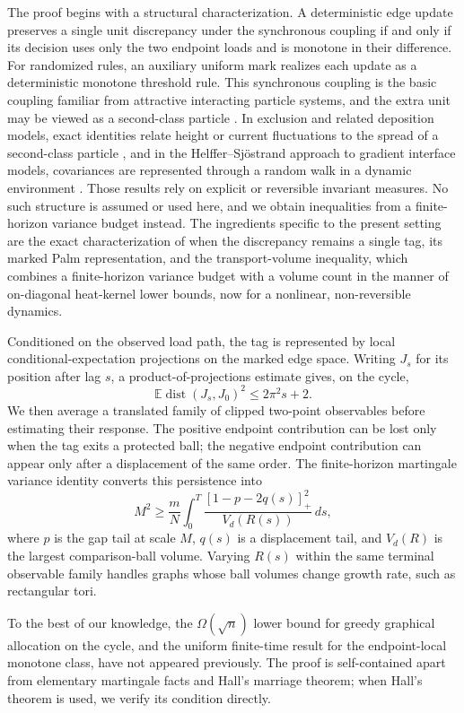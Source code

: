 \documentclass[11pt]{article}
\theoremstyle{remark}
\newcommand{\E}{\mathbb{E}}
\newcommand{\dist}{\operatorname{dist}}
\begin{document}
The proof begins with a structural characterization. A deterministic edge update preserves a single unit discrepancy under the synchronous coupling if and only if its decision uses only the two endpoint loads and is monotone in their difference. For randomized rules, an auxiliary uniform mark realizes each update as a deterministic monotone threshold rule. This synchronous coupling is the basic coupling familiar from attractive interacting particle systems, and the extra unit may be viewed as a second-class particle \cite{Liggett1985}. In exclusion and related deposition models, exact identities relate height or current fluctuations to the spread of a second-class particle \cite{FerrariFontes1994,BalazsSeppalainen2007,BalazsSeppalainen2010}, and in the Helffer--Sj\"ostrand approach to gradient interface models, covariances are represented through a random walk in a dynamic environment \cite{HelfferSjostrand1994,NaddafSpencer1997,GiacominOllaSpohn2001}. Those results rely on explicit or reversible invariant measures. No such structure is assumed or used here, and we obtain inequalities from a finite-horizon variance budget instead. The ingredients specific to the present setting are the exact characterization of when the discrepancy remains a single tag, its marked Palm representation, and the transport-volume inequality, which combines a finite-horizon variance budget with a volume count in the manner of on-diagonal heat-kernel lower bounds, now for a nonlinear, non-reversible dynamics.

Conditioned on the observed load path, the tag is represented by local conditional-expectation projections on the marked edge space. Writing $J_s$ for its position after lag $s$, a product-of-projections estimate gives, on the cycle,
\[
 \E\dist(J_s,J_0)^2\le 2\pi^2s+2.
\]
We then average a translated family of clipped two-point observables before estimating their response. The positive endpoint contribution can be lost only when the tag exits a protected ball; the negative endpoint contribution can appear only after a displacement of the same order. The finite-horizon martingale variance identity converts this persistence into
\[
 M^2\ge \frac mN\int_0^T
 \frac{[1-p-2q(s)]_+^2}{V_d(R(s))}\,ds,
\]
where $p$ is the gap tail at scale $M$, $q(s)$ is a displacement tail, and $V_d(R)$ is the largest comparison-ball volume. Varying $R(s)$ within the same terminal observable family handles graphs whose ball volumes change growth rate, such as rectangular tori.

To the best of our knowledge, the $\Omega(\sqrt n)$ lower bound for greedy graphical allocation on the cycle, and the uniform finite-time result for the endpoint-local monotone class, have not appeared previously. The proof is self-contained apart from elementary martingale facts and Hall's marriage theorem; when Hall's theorem is used, we verify its condition directly.
\end{document}
